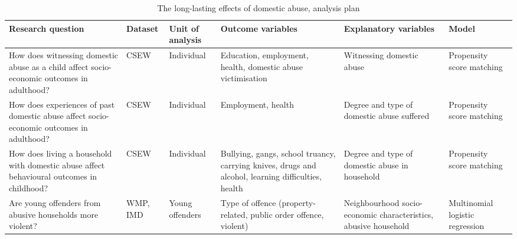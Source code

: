 \documentclass[11pt, a4paper]{article}
\newcommand{\TM}[1] {{\textcolor{orange}{#1}}}
\newcommand{\AT}[1] {{\textcolor{blue}{#1}}}
\begin{document}
 



\begin{table}[!htbp]
\caption{The long-lasting effects of domestic abuse, analysis plan}
  \begin{threeparttable}[t]
  \centering
       \begin{tabular}{ L{3.9cm}  C{1cm}  C{1.9cm}  C{3.2cm}  C{2.8cm}  C{1.6cm} }
    \toprule
     \textbf{Research question} & \textbf{Dataset}    & \textbf{Unit of analysis} & \textbf{Outcome variables} & \textbf{Explanatory variables} & \textbf{Model} \\
    \midrule
    How does witnessing domestic abuse as a child affect socio-economic outcomes in adulthood? & CSEW & Individual & Education, employment, health, domestic abuse victimisation & Witnessing domestic abuse & Propensity score matching \\
                \midrule
                   How does experiences of past domestic abuse affect socio-economic outcomes in adulthood? & CSEW & Individual & Employment, health & Degree and type of domestic abuse suffered & Propensity score matching \\
                \midrule
     How does living a household with domestic abuse affect behavioural outcomes in childhood? & CSEW & Individual & Bullying, gangs, school truancy, carrying knives, drugs and alcohol, learning difficulties, health & Degree and type of domestic abuse in household & Propensity score matching \\
                \midrule
          Are young offenders from abusive households more violent? & WMP, IMD & Young offenders & Type of offence (property-related, public order offence, violent) & Neighbourhood socio-economic characteristics, abusive household & Multinomial logistic regression \\
     \bottomrule
  \end{tabular}
    \end{threeparttable}%
  \label{tab:addlabel}%
\end{table}%
\end{document}
